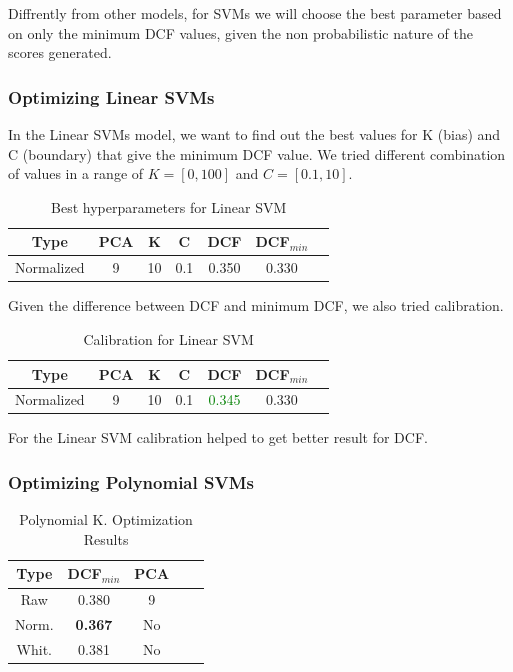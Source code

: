 \documentclass[12pt, twocolumn]{article}
\begin{document}
Diffrently from other models, for SVMs we will choose the best parameter based on only the minimum DCF values,
given the non probabilistic nature of the scores generated.

\subsubsection{Optimizing Linear SVMs}

In the Linear SVMs model, we want to find out the best values for K (bias) and C (boundary) that give the minimum DCF
value.
We tried different combination of values in a range of $K = \left[0,100\right]$ and $C = \left[0.1, 10\right]$.

\begin{table}[H] 
    \centering
    \tiny
    \begin{tabular}{||c|c|c|c|c|c|c||}
        \hline
        Type & PCA & K & C & DCF & DCF$_{min}$ \\
        \hline
        \hline
        Normalized & 9 & 10 & 0.1 & 0.350 & 0.330 \\
        \hline
    \end{tabular}
    \caption{Best hyperparameters for Linear SVM}
\end{table}

Given the difference between DCF and minimum DCF, we also tried calibration.

\begin{table}[H] 
    \centering
    \tiny
    \begin{tabular}{||c|c|c|c|c|c|c||}
        \hline
        Type & PCA & K & C & DCF & DCF$_{min}$ \\
        \hline
        \hline
        Normalized & 9 & 10 & 0.1 & \textcolor{green}{0.345} & 0.330 \\
        \hline
    \end{tabular}
    \caption{Calibration for Linear SVM}
\end{table}

For the Linear SVM calibration helped to get better result for DCF.

\subsubsection{Optimizing Polynomial SVMs}

\begin{table}[H] 
    \centering
    \begin{tabular}{||c|c|c|c|c||}
        \hline
        Type & DCF$_{min}$ & PCA \\
        \hline
        \hline
        Raw   & 0.380 & 9 \\
        Norm. & {\bf 0.367} & No \\
        Whit. & 0.381 & No \\
        \hline
    \end{tabular}
    \caption{Polynomial K. Optimization Results}
    \label{tab:polyoptimization}
\end{table}
\end{document}
